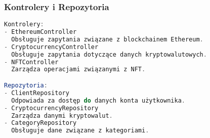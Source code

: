 \subsubsection{Kontrolery i Repozytoria}

\begin{lstlisting}[language=Java, caption={Kontrolery i Repozytoria w aplikacji}]
Kontrolery:
- EthereumController
  Obsługuje zapytania związane z blockchainem Ethereum.
- CryptocurrencyController
  Obsługuje zapytania dotyczące danych kryptowalutowych.
- NFTController
  Zarządza operacjami związanymi z NFT.

Repozytoria:
- ClientRepository
  Odpowiada za dostęp do danych konta użytkownika.
- CryptocurrencyRepository
  Zarządza danymi kryptowalut.
- CategoryRepository
  Obsługuje dane związane z kategoriami.
\end{lstlisting}

